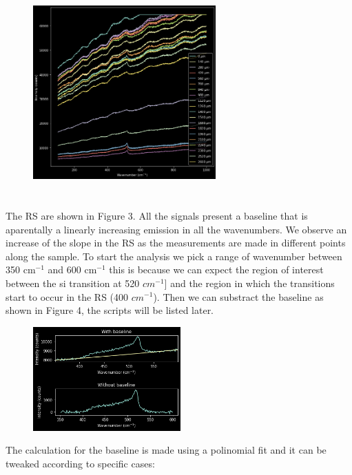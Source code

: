 \documentclass[a4paper,10pt,twocolumn]{article}
\begin{document}
\begin{figure}[h]
  \centering
  \includegraphics[height=8cm, width=7cm]{all_n.png}
\end{figure}


The RS are shown in Figure 3. All the signals present a baseline that is aparentally a linearly increasing emission in all the wavenumbers. We observe an increase of the slope in the RS as the measurements are made in different points along the sample. To start the analysis we pick a range of wavenumber between 350 cm$^{-1}$ and 600 cm$^{-1}$ this is because we can expect the region of interest between the si transition at 520 $cm^{-1}]$ and the region in which the transitions start to occur in the RS (400 $cm^{-1}$). Then we can substract the baseline as shown in Figure 4, the scripts will be listed later.

\begin{figure}[h]
  \centering
  \includegraphics[width=0.9\columnwidth, height=4cm]{baseline.png}
\end{figure}

The calculation for the baseline is made using a polinomial fit and it can be tweaked according to specific cases:
\end{document}
